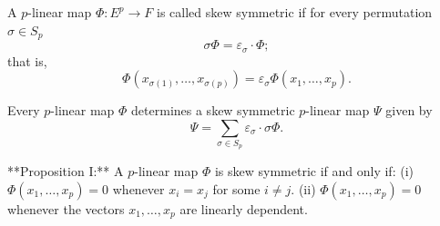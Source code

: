 A $p$-linear map $\Phi: E^p \to F$ is called skew symmetric if for every permutation $\sigma \in S_p$
$$\sigma\Phi = \varepsilon_\sigma \cdot \Phi;$$
that is,
$$\Phi(x_{\sigma(1)}, \ldots, x_{\sigma(p)}) = \varepsilon_\sigma \Phi(x_1, \ldots, x_p).$$

Every $p$-linear map $\Phi$ determines a skew symmetric $p$-linear map $\Psi$ given by
$$\Psi = \sum_{\sigma \in S_p} \varepsilon_\sigma \cdot \sigma\Phi.$$

**Proposition I:** A $p$-linear map $\Phi$ is skew symmetric if and only if:
(i) $\Phi(x_1, \ldots, x_p) = 0$ whenever $x_i = x_j$ for some $i \neq j$.
(ii) $\Phi(x_1, \ldots, x_p) = 0$ whenever the vectors $x_1, \ldots, x_p$ are linearly dependent.
